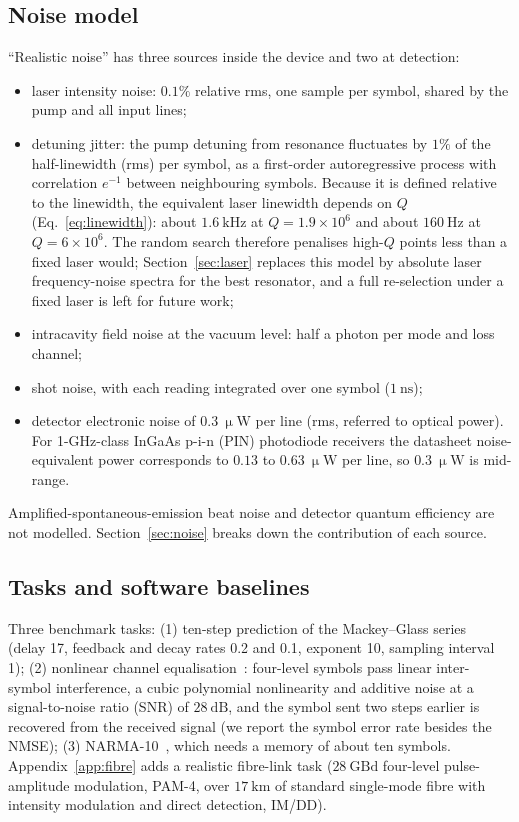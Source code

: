 \subsection{Noise model}\label{sec:noise-model}

``Realistic noise'' has three sources inside the device and two at detection:
\begin{itemize}
\item laser intensity noise: $0.1\%$ relative rms, one sample per symbol, shared by the pump and all input lines;
\item detuning jitter: the pump detuning from resonance fluctuates by $1\%$ of the half-linewidth (rms) per symbol, as a
      first-order autoregressive process with correlation $e^{-1}$ between neighbouring symbols. Because it is defined relative to
      the linewidth, the equivalent laser linewidth depends on $Q$ (Eq.~\eqref{eq:linewidth}): about $1.6~\mathrm{kHz}$ at
      $Q=1.9\times10^{6}$ and about $160~\mathrm{Hz}$ at $Q=6\times10^{6}$. The random search therefore penalises high-$Q$ points less
      than a fixed laser would; Section~\ref{sec:laser} replaces this model by absolute laser frequency-noise spectra for the best
      resonator, and a full re-selection under a fixed laser is left for future work;
\item intracavity field noise at the vacuum level: half a photon per mode and loss channel;
\item shot noise, with each reading integrated over one symbol ($1~\mathrm{ns}$);
\item detector electronic noise of $0.3~\upmu\mathrm{W}$ per line (rms, referred to optical power). For 1-GHz-class InGaAs p-i-n (PIN)
      photodiode receivers the datasheet noise-equivalent power corresponds to $0.13$ to $0.63~\upmu\mathrm{W}$ per line, so $0.3~\upmu\mathrm{W}$
      is mid-range.
\end{itemize}
Amplified-spontaneous-emission beat noise and detector quantum efficiency are not modelled. Section~\ref{sec:noise} breaks down
the contribution of each source.

\subsection{Tasks and software baselines}\label{sec:tasks}

Three benchmark tasks:
(1) ten-step prediction of the Mackey--Glass series~\cite{mackey1977} (delay 17, feedback and decay rates 0.2 and 0.1, exponent 10,
sampling interval 1);
(2) nonlinear channel equalisation~\cite{jaeger2004}: four-level symbols pass linear inter-symbol interference, a cubic
polynomial nonlinearity and additive noise at a signal-to-noise ratio (SNR) of $28~\mathrm{dB}$, and the symbol sent two steps earlier is recovered from the
received signal (we report the symbol error rate besides the NMSE);
(3) NARMA-10~\cite{atiya2000}, which needs a memory of about ten symbols.
Appendix~\ref{app:fibre} adds a realistic fibre-link task ($28~\mathrm{GBd}$ four-level pulse-amplitude modulation, PAM-4, over
$17~\mathrm{km}$ of standard single-mode fibre with intensity modulation and direct detection, IM/DD).


